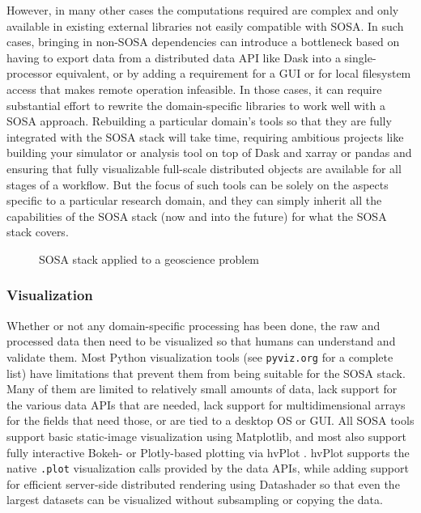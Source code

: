 However, in many other cases the computations required are complex and only available in existing external libraries not easily compatible with SOSA. In such cases, bringing in non-SOSA dependencies can introduce a bottleneck based on having to export data from a distributed data API like Dask into a single-processor equivalent, or by adding a requirement for a GUI or for local filesystem access that makes remote operation infeasible. In those cases, it can require substantial effort to rewrite the domain-specific libraries to work well with a SOSA approach. Rebuilding a particular domain's tools so that they are fully integrated with the SOSA stack will take time, requiring ambitious projects like building your simulator or analysis tool on top of Dask and xarray or pandas and ensuring that fully visualizable full-scale distributed objects are available for all stages of a workflow. But the focus of such tools can be solely on the aspects specific to a particular research domain, and they can simply inherit all the capabilities of the SOSA stack (now and into the future) for what the SOSA stack covers.

\begin{figure}[h]
    \noindent{}
    \caption{SOSA stack applied to a geoscience problem\label{sosa-geoscience}}
\end{figure}
\subsubsection{Visualization}

Whether or not any domain-specific processing has been done, the raw and processed data then need to be visualized so that humans can understand and validate them. Most Python visualization tools (see \texttt{pyviz.org} for a complete list) have limitations that prevent them from being suitable for the SOSA stack. Many of them are limited to relatively small amounts of data, lack support for the various data APIs that are needed, lack support for multidimensional arrays for the fields that need those, or are tied to a desktop OS or GUI. All SOSA tools support basic static-image visualization using Matplotlib, and most also support fully interactive Bokeh- or Plotly-based plotting via hvPlot \cite{rudiger:hvplot}. hvPlot supports the native \texttt{.plot} visualization calls provided by the data APIs, while adding support for efficient server-side distributed rendering using Datashader so that even the largest datasets can be visualized without subsampling or copying the data.

